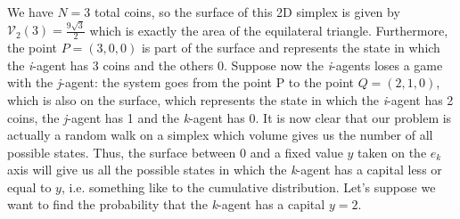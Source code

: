 We have $N=3$ total coins, so the surface of this 2D simplex is given by $\mathcal{V}_{2}\left(3\right) = \frac{9\sqrt{3}}{2}$ which is exactly the area of the equilateral triangle.
Furthermore, the point $P = (3, 0, 0)$ is part of the surface and represents the state in which the \emph{i}-agent has 3 coins and the others 0.
Suppose now the \emph{i}-agents loses a game with the \emph{j}-agent: the system goes from the point P to the point $Q = (2, 1, 0)$, which is also on the surface, which represents the state in which the \emph{i}-agent has 2 coins, the \emph{j}-agent has 1 and the \emph{k}-agent has 0.
It is now clear that our problem is actually a random walk on a simplex which volume gives us the number of all possible states.
Thus, the surface between 0 and a fixed value $y$ taken on the $e_k$ axis will give us all the possible states in which the \emph{k}-agent has a capital less or equal to $y$, i.e. something like to the cumulative distribution.
Let's suppose we want to find the probability that the \emph{k}-agent has a capital $y=2$.
